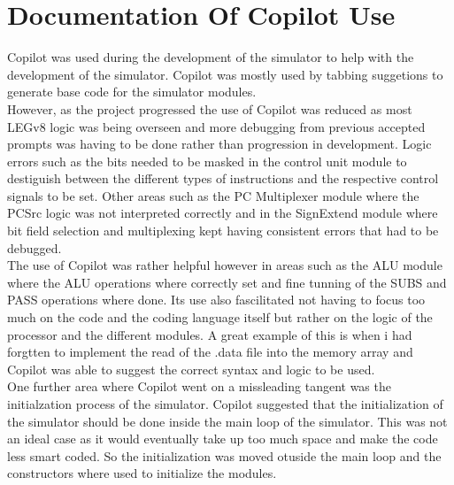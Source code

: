 \documentclass{article}
\begin{document}
\section{Documentation Of Copilot Use}
Copilot was used during the development of the simulator to help with the development of the simulator. Copilot was mostly used by tabbing suggetions to generate base code for the simulator modules.\\

However, as the project progressed the use of Copilot was reduced as most LEGv8 logic was being overseen and more debugging from previous accepted prompts was having to be done rather than progression in development. Logic errors such as the bits needed to be masked in the control unit module to destiguish between the different types of instructions and the respective control signals to be set. Other areas such as the PC Multiplexer module where the PCSrc logic was not interpreted correctly and in the SignExtend module where bit field selection and multiplexing kept having consistent errors that had to be debugged.\\

The use of Copilot was rather helpful however in areas such as the ALU module where the ALU operations where correctly set and fine tunning of the SUBS and PASS operations where done. Its use also fascilitated not having to focus too much on the code and the coding language itself but rather on the logic of the processor and the different modules. A great example of this is when i had forgtten to implement the read of the .data file into the memory array and Copilot was able to suggest the correct syntax and logic to be used.\\

One further area where Copilot went on a missleading tangent was the initialzation process of the simulator. Copilot suggested that the initialization of the simulator should be done inside the main loop of the simulator. This was not an ideal case as it would eventually take up too much space and make the code less smart coded. So the initialization was moved otuside the main loop and the constructors where used to initialize the modules.\\
\end{document}
